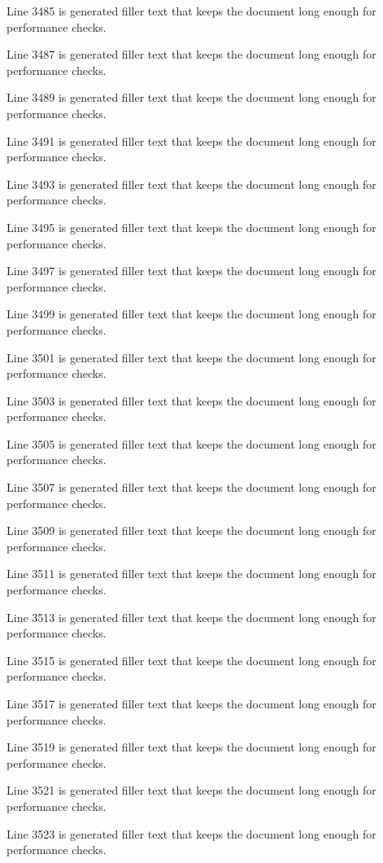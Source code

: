 Line 3485 is generated filler text that keeps the document long enough for performance checks.

Line 3487 is generated filler text that keeps the document long enough for performance checks.

Line 3489 is generated filler text that keeps the document long enough for performance checks.

Line 3491 is generated filler text that keeps the document long enough for performance checks.

Line 3493 is generated filler text that keeps the document long enough for performance checks.

Line 3495 is generated filler text that keeps the document long enough for performance checks.

Line 3497 is generated filler text that keeps the document long enough for performance checks.

Line 3499 is generated filler text that keeps the document long enough for performance checks.

Line 3501 is generated filler text that keeps the document long enough for performance checks.

Line 3503 is generated filler text that keeps the document long enough for performance checks.

Line 3505 is generated filler text that keeps the document long enough for performance checks.

Line 3507 is generated filler text that keeps the document long enough for performance checks.

Line 3509 is generated filler text that keeps the document long enough for performance checks.

Line 3511 is generated filler text that keeps the document long enough for performance checks.

Line 3513 is generated filler text that keeps the document long enough for performance checks.

Line 3515 is generated filler text that keeps the document long enough for performance checks.

Line 3517 is generated filler text that keeps the document long enough for performance checks.

Line 3519 is generated filler text that keeps the document long enough for performance checks.

Line 3521 is generated filler text that keeps the document long enough for performance checks.

Line 3523 is generated filler text that keeps the document long enough for performance checks.

